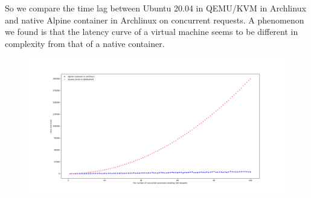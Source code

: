 So we compare the time lag between Ubuntu 20.04 in QEMU/KVM in Archlinux
and native Alpine container in Archlinux on concurrent requests. 
A phenomenon we found is that the latency curve of a virtual
machine seems to be different in complexity from that of a native container.

\begin{figure}
    \centering
    \includegraphics[width=\textwidth]{src/concurrent.png}
    \label{conc}
\end{figure}
